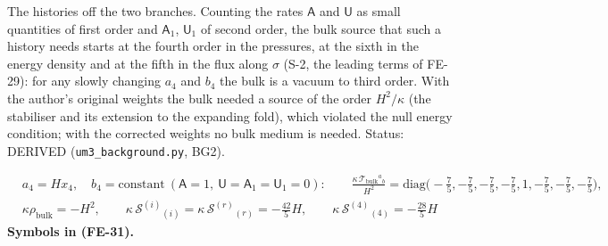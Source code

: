 \documentclass[
  10pt,
]{article}
\begin{document}
The histories off the two branches. Counting the rates \(\mathsf{A}\)
and \(\mathsf{U}\) as small quantities of first order and
\(\mathsf{A}_1\), \(\mathsf{U}_1\) of second order, the bulk source that
such a history needs starts at the fourth order in the pressures, at the
sixth in the energy density and at the fifth in the flux along
\(\sigma\) (S-2, the leading terms of FE-29): for any slowly changing
\(a_4\) and \(b_4\) the bulk is a vacuum to third order. With the
author's original weights the bulk needed a source of the order
\(H^2/\kappa\) (the stabiliser and its extension to the expanding fold),
which violated the null energy condition; with the corrected weights no
bulk medium is needed. Status: DERIVED (\texttt{um3\_background.py},
BG2).

\[
\begin{aligned}
&a_4 = Hx_4,\quad b_4 = \text{constant}\ (\mathsf{A} = 1,\ \mathsf{U} = \mathsf{A}_1 = \mathsf{U}_1 = 0):\qquad
 \frac{\kappa\,\mathcal{T}_{\mathrm{bulk}}{}^a{}_b}{H^2} = \mathrm{diag}\Big(-\frac75, -\frac75, -\frac75, -\frac75, 1, -\frac75, -\frac75, -\frac75\Big),\\
&\kappa\rho_{\mathrm{bulk}} = -H^2,\qquad \kappa\,\mathcal{S}^{(i)}{}_{(i)} = \kappa\,\mathcal{S}^{(r)}{}_{(r)} = -\frac{42}{5}H,\qquad
 \kappa\,\mathcal{S}^{(4)}{}_{(4)} = -\frac{28}{5}H
\end{aligned} \tag{FE-31}
\] \textbf{Symbols in (FE-31).}
\end{document}
